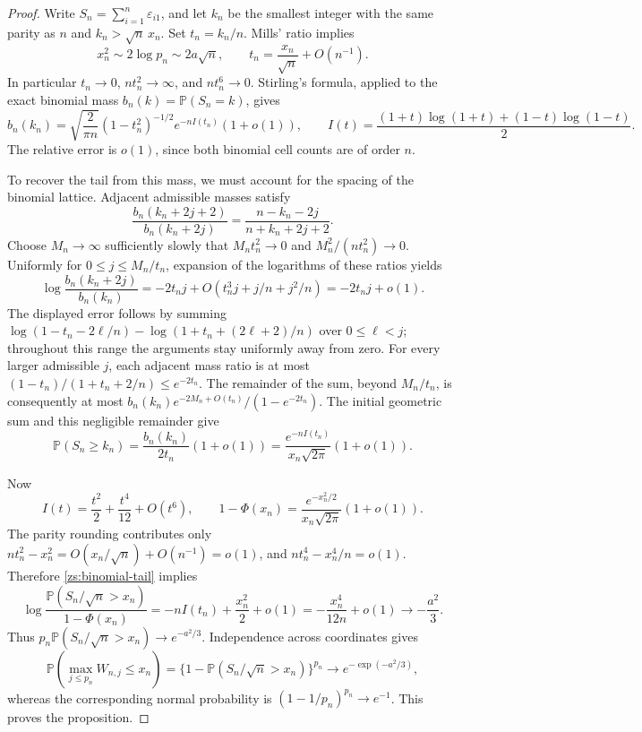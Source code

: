 \documentclass[11pt,a4paper]{article}
\theoremstyle{remark}
\newcommand{\Pp}{\mathbb P}
\begin{document}
\begin{proof}
Write \(S_n=\sum_{i=1}^n\varepsilon_{i1}\), and let \(k_n\) be the
smallest integer with the same parity as \(n\) and
\(k_n>\sqrt n\,x_n\). Set \(t_n=k_n/n\). Mills' ratio implies
\[
 x_n^2\sim2\log p_n\sim2a\sqrt n,
 \qquad t_n=\frac{x_n}{\sqrt n}+O(n^{-1}).
\]
In particular \(t_n\to0\), \(nt_n^2\to\infty\), and
\(nt_n^6\to0\). Stirling's formula, applied to the exact binomial
mass \(b_n(k)=\Pp(S_n=k)\), gives
\begin{equation}
 b_n(k_n)=\sqrt{\frac2{\pi n}}(1-t_n^2)^{-1/2}
              e^{-nI(t_n)}(1+o(1)),
 \qquad
 I(t)=\frac{(1+t)\log(1+t)+(1-t)\log(1-t)}2.
 \label{zs:binomial-mass}
\end{equation}
The relative error is \(o(1)\), since both binomial cell counts are
of order \(n\).

To recover the tail from this mass, we must account for the spacing
of the binomial lattice. Adjacent admissible masses satisfy
\[
 \frac{b_n(k_n+2j+2)}{b_n(k_n+2j)}
 =\frac{n-k_n-2j}{n+k_n+2j+2}.
\]
Choose \(M_n\to\infty\) sufficiently slowly that
\(M_nt_n^2\to0\) and \(M_n^2/(nt_n^2)\to0\).
Uniformly for \(0\le j\le M_n/t_n\), expansion of the logarithms
of these ratios yields
\[
 \log\frac{b_n(k_n+2j)}{b_n(k_n)}
 =-2t_nj+O(t_n^3j+j/n+j^2/n)
 =-2t_nj+o(1).
\]
The displayed error follows by summing
\(\log(1-t_n-2\ell/n)-\log(1+t_n+(2\ell+2)/n)\)
over \(0\le\ell<j\); throughout this range the arguments stay
uniformly away from zero. For every larger admissible \(j\), each
adjacent mass ratio is at most
\((1-t_n)/(1+t_n+2/n)\le e^{-2t_n}\).
The remainder of the sum, beyond \(M_n/t_n\), is consequently at
most \(b_n(k_n)e^{-2M_n+O(t_n)}/(1-e^{-2t_n})\).
The initial geometric sum and this negligible remainder give
\begin{equation}
 \Pp(S_n\ge k_n)
 =\frac{b_n(k_n)}{2t_n}(1+o(1))
 =\frac{e^{-nI(t_n)}}{x_n\sqrt{2\pi}}(1+o(1)).
 \label{zs:binomial-tail}
\end{equation}

Now
\[
 I(t)=\frac{t^2}2+\frac{t^4}{12}+O(t^6),
 \qquad
 1-\Phi(x_n)=\frac{e^{-x_n^2/2}}{x_n\sqrt{2\pi}}(1+o(1)).
\]
The parity rounding contributes only
\(nt_n^2-x_n^2=O(x_n/\sqrt n)+O(n^{-1})=o(1)\), and
\(nt_n^4-x_n^4/n=o(1)\). Therefore \eqref{zs:binomial-tail} implies
\begin{equation}
 \log\frac{\Pp(S_n/\sqrt n>x_n)}{1-\Phi(x_n)}
 =-nI(t_n)+\frac{x_n^2}2+o(1)
 =-\frac{x_n^4}{12n}+o(1)
 \longrightarrow-\frac{a^2}3.
 \label{zs:tail-ratio}
\end{equation}
Thus \(p_n\Pp(S_n/\sqrt n>x_n)\to e^{-a^2/3}\). Independence
across coordinates gives
\[
 \Pp(\max_{j\le p_n}W_{n,j}\le x_n)
 =\{1-\Pp(S_n/\sqrt n>x_n)\}^{p_n}
 \longrightarrow e^{-\exp(-a^2/3)},
\]
whereas the corresponding normal probability is
\((1-1/p_n)^{p_n}\to e^{-1}\). This proves the proposition.
\end{proof}
\end{document}
